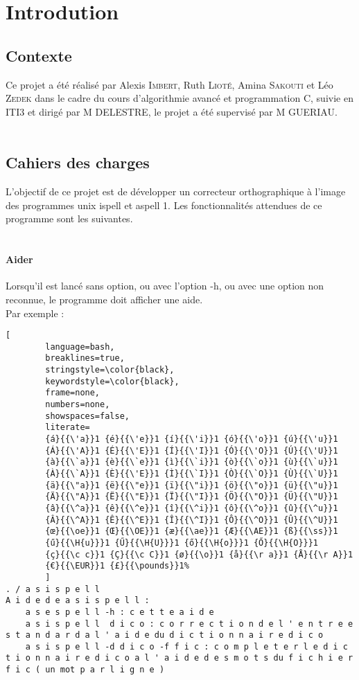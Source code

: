 \section{Introdution}
\subsection{Contexte}
Ce projet a été réalisé par Alexis \textsc{Imbert}, Ruth \textsc{Lioté}, Amina \textsc{Sakouti} et Léo \textsc{Zedek} dans le cadre du cours d'algorithmie avancé et programmation C, suivie en ITI3 et dirigé par M DELESTRE, le projet a été supervisé par M GUERIAU.\\
\\
\subsection{Cahiers des charges}
L'objectif de ce projet est de développer un correcteur orthographique à l'image des programmes unix ispell et aspell 1. Les fonctionnalités attendues de ce programme sont les suivantes.\\
\\
\paragraph{Aider}
Lorsqu'il est lancé sans option, ou avec l'option -h, ou avec une option non reconnue, le programme doit afficher une aide.\\
Par exemple :
\begin{lstlisting}[
		language=bash,
		breaklines=true,
		stringstyle=\color{black},
		keywordstyle=\color{black},
		frame=none,
		numbers=none,
		showspaces=false,
		literate=
		{á}{{\'a}}1 {é}{{\'e}}1 {í}{{\'i}}1 {ó}{{\'o}}1 {ú}{{\'u}}1
		{Á}{{\'A}}1 {É}{{\'E}}1 {Í}{{\'I}}1 {Ó}{{\'O}}1 {Ú}{{\'U}}1
		{à}{{\`a}}1 {è}{{\`e}}1 {ì}{{\`i}}1 {ò}{{\`o}}1 {ù}{{\`u}}1
		{À}{{\`A}}1 {È}{{\'E}}1 {Ì}{{\`I}}1 {Ò}{{\`O}}1 {Ù}{{\`U}}1
		{ä}{{\"a}}1 {ë}{{\"e}}1 {ï}{{\"i}}1 {ö}{{\"o}}1 {ü}{{\"u}}1
		{Ä}{{\"A}}1 {Ë}{{\"E}}1 {Ï}{{\"I}}1 {Ö}{{\"O}}1 {Ü}{{\"U}}1
		{â}{{\^a}}1 {ê}{{\^e}}1 {î}{{\^i}}1 {ô}{{\^o}}1 {û}{{\^u}}1
		{Â}{{\^A}}1 {Ê}{{\^E}}1 {Î}{{\^I}}1 {Ô}{{\^O}}1 {Û}{{\^U}}1
		{œ}{{\oe}}1 {Œ}{{\OE}}1 {æ}{{\ae}}1 {Æ}{{\AE}}1 {ß}{{\ss}}1
		{ű}{{\H{u}}}1 {Ű}{{\H{U}}}1 {ő}{{\H{o}}}1 {Ő}{{\H{O}}}1
		{ç}{{\c c}}1 {Ç}{{\c C}}1 {ø}{{\o}}1 {å}{{\r a}}1 {Å}{{\r A}}1
		{€}{{\EUR}}1 {£}{{\pounds}}1%
		]
. / a s i s p e l l
A i d e d e a s i s p e l l :
	a s e s p e l l -h : c e t t e a i d e
	a s i s p e l l	 d i c o : c o r r e c t i o n d e l ' e n t r e e s t a n d a r d a l ' a i d e du d i c t i o n n a i r e d i c o
	a s i s p e l l -d d i c o -f f i c : c o m p l e t e r l e d i c t i o n n a i r e d i c o a l ' a i d e d e s m o t s du f i c h i e r f i c ( un mot p a r l i g n e )
\end{lstlisting}
